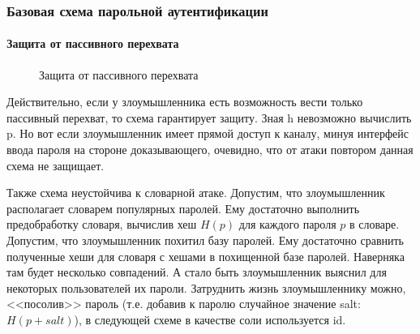\begin{frame}
\frametitle{Базовая схема парольной аутентификации}
\framesubtitle{Защита от пассивного перехвата}
\begin{figure}
    \begin{center}
    \end{center}
    \caption{Защита от пассивного перехвата}\label{pict:pwdhashbase}
\end{figure} 
\end{frame}


Действительно, если у злоумышленника есть возможность вести только пассивный перехват, то схема гарантирует защиту. Зная h невозможно вычислить p. Но вот если злоумышленник имеет прямой доступ к каналу, минуя интерфейс ввода пароля на стороне доказывающего, очевидно, что от атаки повтором данная схема не защищает.

Также схема неустойчива к словарной атаке. Допустим, что злоумышленник располагает словарем популярных паролей. Ему достаточно выполнить предобработку словаря, вычислив хеш $H(p)$ для каждого пароля $p$ в словаре. Допустим, что злоумышленник похитил базу паролей. Ему достаточно сравнить полученные хеши для словаря с хешами в похищенной базе паролей. Наверняка там будет несколько совпадений. А стало быть злоумышленник выяснил для некоторых пользователей их пароли. Затруднить жизнь злоумышленнику можно, <<посолив>> пароль (т.е. добавив к паролю случайное значение salt: $H(p+salt)$), в следующей схеме в качестве соли используется id.


